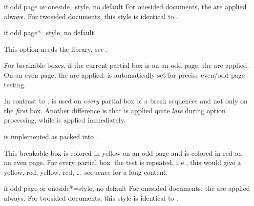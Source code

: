 \begin{docTcbKey}[][doc new=2016-11-18]{if odd page or oneside}{=}{style, no default}
  For onesided documents, the  are applied always.
  For twosided documents, this style is identical to .
\end{docTcbKey}


\clearpage
\begin{docTcbKey}[][doc new=2015-11-13]{if odd page*}{=}{style, no default}
\begin{marker}
This option needs the  library, see .
\end{marker}
For breakable boxes, if the current partial box is on an odd page, the  are applied.
On an even page, the  are applied.
 is automatically set for precise even/odd page testing.

In contrast to ,  is used
on \emph{every} partial box of a break sequences and not only on the
\emph{first} box. Another difference is that 
is applied quite \emph{late} during option processing, while
 is applied immediately.

 is implemented as 
packed into .

\begin{dispExample}
\begin{tcolorbox}[breakable,if odd page*={colback=yellow!50}{colback=red!50}]
  This breakable box is colored in yellow on an odd page
  and is colored in red on an even page. For every partial box, the
  test is repeated, i.\,e., this would give a yellow, red, yellow, red, \ldots\
  sequence for a long content.
\end{tcolorbox}
\end{dispExample}
\end{docTcbKey}


\begin{docTcbKey}[][doc new=2016-11-18]{if odd page or oneside*}{=}{style, no default}
  For onesided documents, the \meta{odd options} are applied always.
  For twosided documents, this style is identical to .
\end{docTcbKey}



